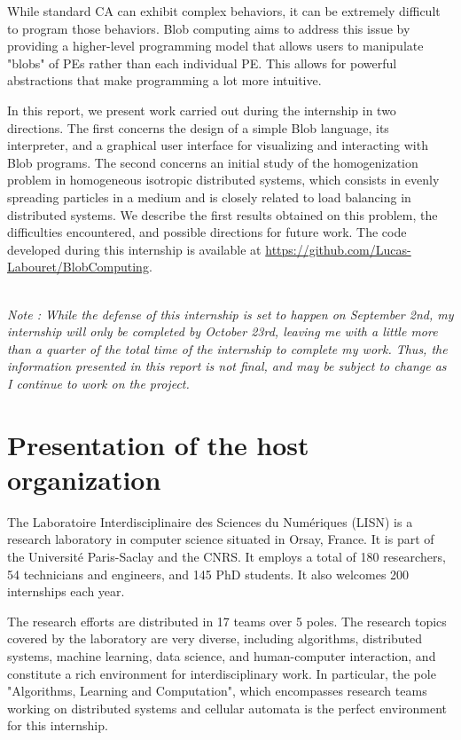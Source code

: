 \documentclass[11pt,a4paper]{report}
\begin{document}
While standard CA can exhibit complex behaviors, it can be extremely difficult to program those behaviors. Blob computing aims to address this issue by providing a higher-level programming model that allows users to manipulate "blobs" of PEs rather than each individual PE. This allows for powerful abstractions that make programming a lot more intuitive.

In this report, we present work carried out during the internship in two directions. The first concerns the design of a simple Blob language, its interpreter, and a graphical user interface for visualizing and interacting with Blob programs. The second concerns an initial study of the homogenization problem in homogeneous isotropic distributed systems, which consists in evenly spreading particles in a medium and is closely related to load balancing in distributed systems. We describe the first results obtained on this problem, the difficulties encountered, and possible directions for future work. The code developed during this internship is available at \url{https://github.com/Lucas-Labouret/BlobComputing}.

$ $\\
{\it \scriptsize Note : While the defense of this internship is set to happen on September 2nd, my internship will only be completed by October 23rd, leaving me with a little more than a quarter of the total time of the internship to complete my work. Thus, the information presented in this report is not final, and may be subject to change as I continue to work on the project.}

\section{Presentation of the host organization} 

The Laboratoire Interdisciplinaire des Sciences du Numériques (LISN) is a research laboratory in computer science situated in Orsay, France. It is part of the Université Paris-Saclay and the CNRS. It employs a total of 180 researchers, 54 technicians and engineers, and 145 PhD students. It also welcomes 200 internships each year.

The research efforts are distributed in 17 teams over 5 poles. The research topics covered by the laboratory are very diverse, including algorithms, distributed systems, machine learning, data science, and human-computer interaction, and constitute a rich environment for interdisciplinary work. In particular, the pole "Algorithms, Learning and Computation", which encompasses research teams working on distributed systems and cellular automata is the perfect environment for this internship.
\end{document}
